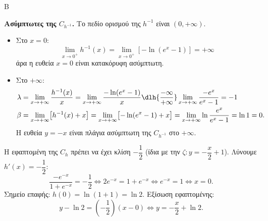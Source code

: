 \begin{thema}{Β}
\begin{erwthma}[resume]
\textbf{Ασύμπτωτες της $C_{h^{-1}}$.}
Το πεδίο ορισμού της $h^{-1}$ είναι $(0,+\infty)$.
\begin{itemize}
    \item Στο $x=0$:
\[\lim\limits_{x\to0^+}{h^{-1}(x)}=\lim\limits_{x\to0^+}{\left[-\ln\left(e^x-1\right)\right]}=+\infty\]
 άρα η ευθεία $x=0$ είναι κατακόρυφη ασύμπτωτη.
    \item Στο $+\infty$:
    \begin{align*}
	\lambda&=\lim_{x\to+\infty}\frac{h^{-1}(x)}{x}=\lim_{x\to+\infty}\frac{-\ln(e^x-1)}{x}\dlh{\frac{-\infty}{+\infty}}\lim_{x\to+\infty}{\frac{-e^x}{e^x-1}}=-1\\
    \beta&=\lim_{x\to+\infty}\bigl[h^{-1}(x)+x\bigr]=\lim_{x\to+\infty}\bigl[-\ln(e^x-1)+x\bigr]=\lim_{x\to+\infty}\ln\frac{e^x}{e^x-1}=\ln1=0.
	\end{align*}
    Η ευθεία $y=-x$ είναι πλάγια ασύμπτωτη της $C_{h^{-1}}$ στο $+\infty$.
\end{itemize}

\item Η εφαπτομένη της $C_h$ πρέπει να έχει κλίση $-\dfrac{1}{2}$ (ίδια με την $\zeta: y=-\dfrac{x}{2}+1$).
Λύνουμε $h'(x)=-\dfrac{1}{2}$:
\[
\frac{-e^{-x}}{1+e^{-x}}=-\frac{1}{2}\Leftrightarrow 2e^{-x}=1+e^{-x}\Leftrightarrow e^{-x}=1\Leftrightarrow x=0.
\]
Σημείο επαφής: $h(0)=\ln\!\left(1+1\right)=\ln 2$.
Εξίσωση εφαπτομένης:
\[
y-\ln2=\left(-\frac{1}{2}\right)(x-0)\Leftrightarrow y=-\frac{x}{2}+\ln2.
\]

\end{erwthma}
\end{thema}
